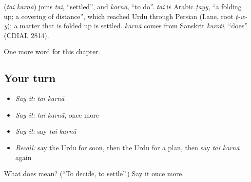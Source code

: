 \begin{cousinweb}
\textbf{ } (\emph{tai karnā}) joins \emph{tai}, \textquotedblleft{}settled\textquotedblright{}, and \emph{karnā}, \textquotedblleft{}to do\textquotedblright{}. \emph{tai} is Arabic \emph{ṭayy}, \textquotedblleft{}a folding up; a covering of distance\textquotedblright{}, which reached Urdu through Persian (Lane, root \emph{ṭ-w-y}); a matter that is folded up is settled. \emph{karnā} comes from Sanskrit \emph{karoti}, \textquotedblleft{}does\textquotedblright{} (CDIAL 2814).
\end{cousinweb}

\begin{grammarlens}[title={What you've built}]
One more word for this chapter.
\end{grammarlens}

\subsection*{Your turn}
\begin{itemize}
\raggedright
  \item \emph{Say it:} \emph{tai karnā}
  \item \emph{Say it:} \emph{tai karnā}, once more
  \item \emph{Say it:} say \emph{tai karnā}
  \item \emph{Recall:} say the Urdu for soon, then the Urdu for a plan, then say \emph{tai karnā} again
\end{itemize}

\begin{tcolorbox}[breakable,colback=teal!4,colframe=teal!35!black,title={Before you move on}]
What does   mean? (\textquotedblleft{}To decide, to settle\textquotedblright{}.) Say it once more.
\end{tcolorbox}
